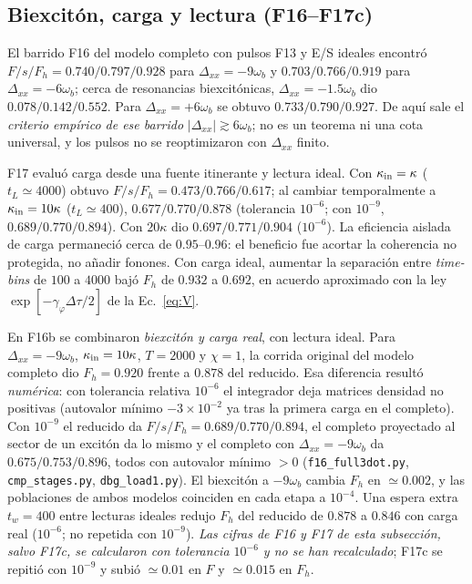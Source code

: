 \documentclass[11pt,a4paper]{article}
\newcommand{\wb}{\omega_b}
\newcommand{\gphi}{\gamma_\varphi}
\newcommand{\Dxx}{\Delta_{xx}}
\begin{document}
\subsection{Biexcitón, carga y lectura (F16--F17c)}
El barrido F16 del modelo completo con pulsos F13 y E/S ideales encontró
$F/s/F_h=0.740/0.797/0.928$ para $\Dxx=-9\wb$ y
$0.703/0.766/0.919$ para $\Dxx=-6\wb$; cerca de resonancias biexcitónicas,
$\Dxx=-1.5\wb$ dio $0.078/0.142/0.552$. Para $\Dxx=+6\wb$
se obtuvo $0.733/0.790/0.927$. De aquí sale el \emph{criterio empírico de ese barrido}
$|\Dxx|\gtrsim6\wb$; no es un teorema ni una cota universal, y los pulsos no
se reoptimizaron con $\Dxx$ finito.

F17 evaluó carga desde una fuente itinerante y lectura ideal. Con $\kappa_{\rm in}=\kappa$
($t_L\simeq4000$) obtuvo $F/s/F_h=0.473/0.766/0.617$;
al cambiar temporalmente a $\kappa_{\rm in}=10\kappa$ ($t_L\simeq400$),
$0.677/0.770/0.878$ (tolerancia $10^{-6}$; con $10^{-9}$, $0.689/0.770/0.894$). Con $20\kappa$ dio $0.697/0.771/0.904$ ($10^{-6}$).
La eficiencia aislada de carga permaneció cerca de $0.95$--$0.96$:
el beneficio fue acortar la coherencia no protegida, no añadir fonones.
Con carga ideal, aumentar la separación entre \emph{time-bins} de $100$ a
$4000$ bajó $F_h$ de $0.932$ a $0.692$, en acuerdo aproximado con la ley
$\exp[-\gphi\Delta\tau/2]$ de la Ec.~\eqref{eq:V}.

En F16b se combinaron \emph{biexcitón y carga real}, con lectura ideal.
Para $\Dxx=-9\wb$, $\kappa_{\rm in}=10\kappa$, $T=2000$ y $\chi=1$,
la corrida original del modelo completo dio $F_h=0.920$ frente a $0.878$ del reducido.
Esa diferencia resultó \emph{numérica}: con tolerancia relativa $10^{-6}$ el integrador deja matrices densidad no positivas
(autovalor mínimo $-3\times10^{-2}$ ya tras la primera carga en el completo). Con $10^{-9}$ el reducido da
$F/s/F_h=0.689/0.770/0.894$, el completo proyectado al sector de un excitón da lo mismo
y el completo con $\Dxx=-9\wb$ da $0.675/0.753/0.896$, todos con autovalor mínimo $>0$
(\texttt{f16\_full3dot.py}, \texttt{cmp\_stages.py}, \texttt{dbg\_load1.py}).
El biexcitón a $-9\wb$ cambia $F_h$ en $\simeq0.002$, y las poblaciones de ambos modelos
coinciden en cada etapa a $10^{-4}$. Una espera extra $t_w=400$ entre lecturas ideales
redujo $F_h$ del reducido de $0.878$ a $0.846$ con carga real ($10^{-6}$; no repetida con $10^{-9}$).
\emph{Las cifras de F16 y F17 de esta subsección, salvo F17c, se calcularon con tolerancia $10^{-6}$
y no se han recalculado}; F17c se repitió con $10^{-9}$ y subió $\simeq0.01$ en $F$ y $\simeq0.015$ en $F_h$.
\end{document}

